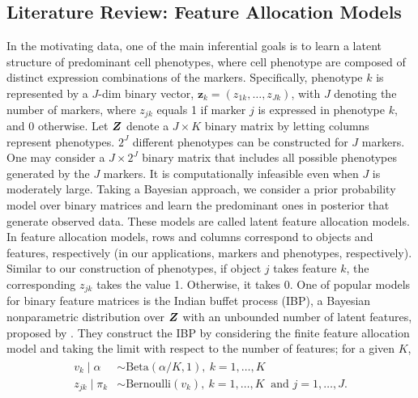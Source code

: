 \documentclass[12pt,]{article}
\newcommand{\bZ}{\mbox{\boldmath $Z$}}
\begin{document}
\subsection{Literature Review: Feature Allocation Models}\label{literature-review}
In the motivating data, one of the main inferential goals is  to learn a latent structure of predominant cell phenotypes, where cell phenotype are composed of distinct expression combinations of the markers. Specifically, phenotype $k$ is represented by a $J$-dim binary vector, $\bm z_k=(z_{1k}, \ldots, z_{Jk})$, with $J$ denoting the number of markers, where $z_{jk}$ equals 1 if marker $j$ is expressed in phenotype $k$, and 0 otherwise.  Let $\bZ$ denote a $J \times K$ binary matrix by letting columns represent phenotypes.  \(2^J\) different phenotypes can be constructed for \(J\) markers.
One may consider a \(J \times 2^J\) binary matrix that includes all possible
phenotypes generated by the \(J\) markers. It is computationally infeasible even when \(J\) is moderately large. Taking a Bayesian approach, we consider a prior probability model over binary matrices %
and learn the predominant ones in posterior that  generate observed data. %
These models are called latent feature allocation models. In feature allocation models, rows and columns correspond to objects and features, respectively (in our applications, markers and phenotypes, respectively). Similar to our construction of phenotypes, if object $j$ takes feature $k$, the corresponding $z_{jk}$ takes the value 1. Otherwise, it takes 0.  One of popular models for binary feature matrices is the Indian buffet process (IBP), a Bayesian nonparametric distribution over $\bZ$ with an unbounded number of latent features, proposed by \citet{griffiths2011indian}. 
They construct the IBP by considering the finite feature allocation
model and taking the limit with respect to the number of features; for a given $K$,
\begin{align}
\begin{split}
v_k \mid \alpha &\sim \text{Beta}(\alpha/K, 1),~ k=1, \ldots, K \\
z_{jk} \mid \pi_k &\sim \text{Bernoulli}(v_k),~ k=1, \ldots, K~\mbox{ and } j=1, \ldots, J. \\
\end{split}
\label{eq:ibp}
\end{align}
\end{document}
